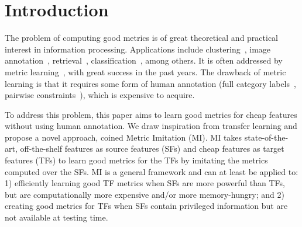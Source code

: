 \documentclass[10pt,twocolumn,letterpaper]{article}
\begin{document}


\section{Introduction}

The problem of computing good metrics is of great theoretical and
practical interest in information processing. Applications include
clustering~\cite{metric:nips03, metric:clustering:12}, image
annotation~\cite{tagprop:iccv09},
retrieval~\cite{local_distance:iccv:07, ml:fast:search:09},
classification~\cite{eigenface:pami97, local_distance:iccv:07,
  max:margin:knn}, among others.  It is often addressed by metric
learning~\cite{pairwise:metric:IJCAI09, large:scale:metric:cvpr12,
  tagprop:iccv09, max:margin:knn, qin:bmvc14}, with great success in
the past years. The drawback of metric learning is that it requires
some form of human annotation (\eg full category
labels~\cite{eigenface:pami97, local_distance:iccv:07, max:margin:knn,
  mlr:10}, pairwise constraints~\cite{pairwise:metric:IJCAI09,
  ml:fast:search:09, large:scale:metric:cvpr12,
  fetlearn:convex:pami14}), which is expensive to acquire.

To address this problem, this paper aims to learn good metrics for cheap features without
using human annotation. We draw inspiration from transfer learning and
propose a novel approach, coined Metric Imitation (MI). 
MI takes state-of-the-art, off-the-shelf features as source features (SFs) and cheap features 
as target features (TFs) to learn good
metrics for the TFs by imitating the metrics computed
over the SFs. MI is a general framework and can at least
be applied to: 1) efficiently learning good TF metrics when
SFs are more powerful than TFs, but are computationally more expensive
and/or more memory-hungry; and 2) creating good metrics for TFs when SFs
contain privileged information but are not available at testing time. 
\end{document}
